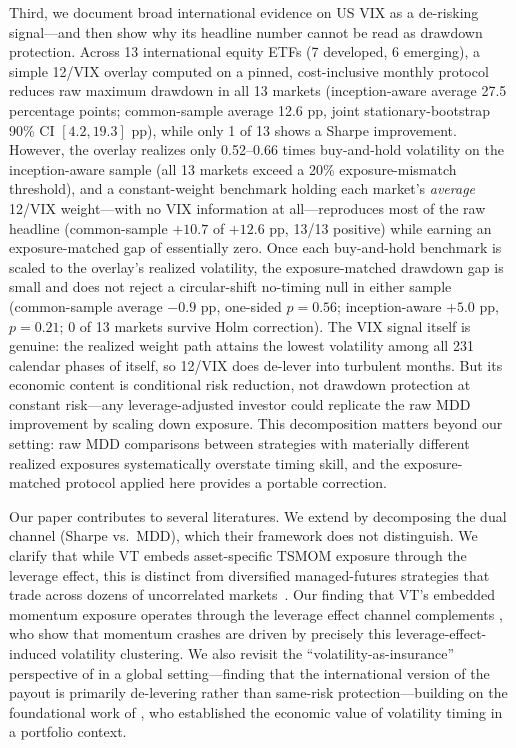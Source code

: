 Third, we document broad international evidence on US VIX as a de-risking signal---and then show why its headline number cannot be read as drawdown protection. Across 13 international equity ETFs (7 developed, 6 emerging), a simple 12/VIX overlay computed on a pinned, cost-inclusive monthly protocol reduces raw maximum drawdown in all 13 markets (inception-aware average 27.5 percentage points; common-sample average 12.6 pp, joint stationary-bootstrap 90\% CI $[4.2, 19.3]$ pp), while only 1 of 13 shows a Sharpe improvement. However, the overlay realizes only 0.52--0.66 times buy-and-hold volatility on the inception-aware sample (all 13 markets exceed a 20\% exposure-mismatch threshold), and a constant-weight benchmark holding each market's \emph{average} 12/VIX weight---with no VIX information at all---reproduces most of the raw headline (common-sample $+10.7$ of $+12.6$ pp, 13/13 positive) while earning an exposure-matched gap of essentially zero. Once each buy-and-hold benchmark is scaled to the overlay's realized volatility, the exposure-matched drawdown gap is small and does not reject a circular-shift no-timing null in either sample (common-sample average $-0.9$ pp, one-sided $p = 0.56$; inception-aware $+5.0$ pp, $p = 0.21$; 0 of 13 markets survive Holm correction). The VIX signal itself is genuine: the realized weight path attains the lowest volatility among all 231 calendar phases of itself, so 12/VIX does de-lever into turbulent months. But its economic content is conditional risk reduction, not drawdown protection at constant risk---any leverage-adjusted investor could replicate the raw MDD improvement by scaling down exposure. This decomposition matters beyond our setting: raw MDD comparisons between strategies with materially different realized exposures systematically overstate timing skill, and the exposure-matched protocol applied here provides a portable correction.

Our paper contributes to several literatures. We extend \citet{hood2025} by decomposing the dual channel (Sharpe vs.\ MDD), which their framework does not distinguish. We clarify that while VT embeds asset-specific TSMOM exposure through the leverage effect, this is distinct from diversified managed-futures strategies that trade across dozens of uncorrelated markets~\citep{moskowitz2012, baltas2013}. Our finding that VT's embedded momentum exposure operates through the leverage effect channel complements \citet{daniel2016}, who show that momentum crashes are driven by precisely this leverage-effect-induced volatility clustering. We also revisit the ``volatility-as-insurance'' perspective of \citet{lai2026a} in a global setting---finding that the international version of the payout is primarily de-levering rather than same-risk protection---building on the foundational work of \citet{fleming2001}, who established the economic value of volatility timing in a portfolio context.

